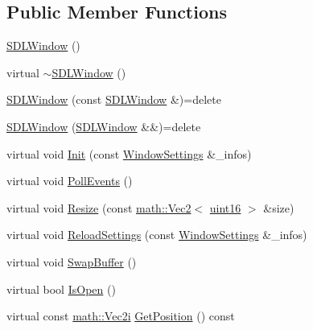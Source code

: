 \subsection*{Public Member Functions}
\begin{DoxyCompactItemize}
\item 
\mbox{\hyperlink{classpad_1_1sys_1_1_s_d_l_window_a545ce6b68cf03a84e5602e073f2edf99}{S\+D\+L\+Window}} ()
\item 
virtual \mbox{\hyperlink{classpad_1_1sys_1_1_s_d_l_window_a7baa8b1db939c5e1dab0cf19d9fe471a}{$\sim$\+S\+D\+L\+Window}} ()
\item 
\mbox{\hyperlink{classpad_1_1sys_1_1_s_d_l_window_a48fdb9ea4f9d04e0e85be929b485417b}{S\+D\+L\+Window}} (const \mbox{\hyperlink{classpad_1_1sys_1_1_s_d_l_window}{S\+D\+L\+Window}} \&)=delete
\item 
\mbox{\hyperlink{classpad_1_1sys_1_1_s_d_l_window_a2c16cacdc5ab08b8d84e00f287cab5ad}{S\+D\+L\+Window}} (\mbox{\hyperlink{classpad_1_1sys_1_1_s_d_l_window}{S\+D\+L\+Window}} \&\&)=delete
\item 
virtual void \mbox{\hyperlink{classpad_1_1sys_1_1_s_d_l_window_a7749e49f614ac33a95f1ef4ffed853e7}{Init}} (const \mbox{\hyperlink{structpad_1_1sys_1_1_window_settings}{Window\+Settings}} \&\+\_\+infos)
\item 
virtual void \mbox{\hyperlink{classpad_1_1sys_1_1_s_d_l_window_a66014e181e30c20a3488ff715d106665}{Poll\+Events}} ()
\item 
virtual void \mbox{\hyperlink{classpad_1_1sys_1_1_s_d_l_window_aba5a51090a6865da6d47826af28413ef}{Resize}} (const \mbox{\hyperlink{namespacepad_1_1math_a9773bcf81aa2ddd829bc327d822c6552}{math\+::\+Vec2}}$<$ \mbox{\hyperlink{namespacepad_a03b9241a5f6a191da2faac64714e1038}{uint16}} $>$ \&size)
\item 
virtual void \mbox{\hyperlink{classpad_1_1sys_1_1_s_d_l_window_a7f45cd8f1ffa83c4aaedf40b69012870}{Reload\+Settings}} (const \mbox{\hyperlink{structpad_1_1sys_1_1_window_settings}{Window\+Settings}} \&\+\_\+infos)
\item 
virtual void \mbox{\hyperlink{classpad_1_1sys_1_1_s_d_l_window_a991b47b499f3073e4d1962c2512e2ae8}{Swap\+Buffer}} ()
\item 
virtual bool \mbox{\hyperlink{classpad_1_1sys_1_1_s_d_l_window_ae76d9066f3c36e8b949b6c211be0affd}{Is\+Open}} ()
\item 
virtual const \mbox{\hyperlink{namespacepad_1_1math_a808a631a6bccd994f9589d7fb86bad41}{math\+::\+Vec2i}} \mbox{\hyperlink{classpad_1_1sys_1_1_s_d_l_window_a43391052519ec0bc8c194642d6d68d12}{Get\+Position}} () const

\end{DoxyCompactItemize}

